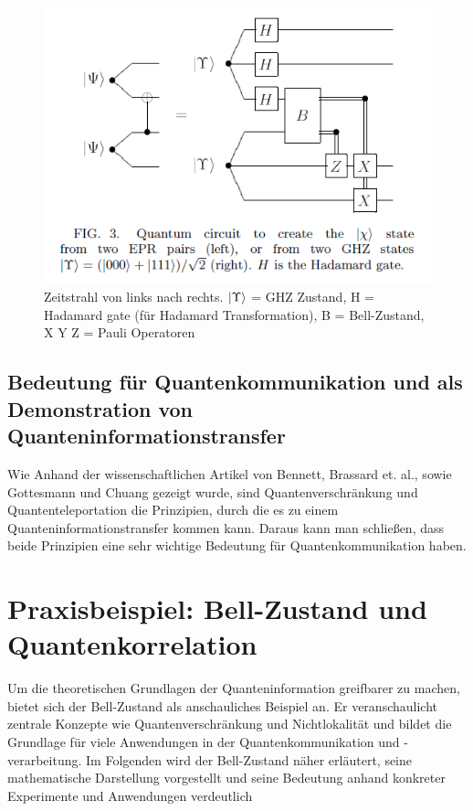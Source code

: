 \begin{figure}[h!]
    \centering
    \includegraphics[width=1.0\textwidth]{images/quantum-information/quantenteleportation_cnot_3.png}
    \caption{Zeitstrahl von links nach rechts. \(\ket{\Upsilon}\) = GHZ Zustand, H = Hadamard gate (für Hadamard Transformation), B = Bell-Zustand, X Y Z = Pauli Operatoren}
    \label{fig:meinbild}
\end{figure}
\newpage

\subsection{Bedeutung für Quantenkommunikation und als Demonstration von Quanteninformationstransfer}
Wie Anhand der wissenschaftlichen Artikel von Bennett, Brassard et. al., sowie Gottesmann und Chuang gezeigt wurde, sind Quantenverschränkung und Quantenteleportation die Prinzipien, durch die es zu einem Quanteninformationstransfer kommen kann. Daraus kann man schließen, dass beide Prinzipien eine sehr wichtige Bedeutung für Quantenkommunikation haben.

\section{Praxisbeispiel: Bell-Zustand und Quantenkorrelation}

Um die theoretischen Grundlagen der Quanteninformation greifbarer zu machen, bietet sich der Bell-Zustand als anschauliches Beispiel an. Er veranschaulicht zentrale Konzepte wie Quantenverschränkung und Nichtlokalität und bildet die Grundlage für viele Anwendungen in der Quantenkommunikation und -verarbeitung. Im Folgenden wird der Bell-Zustand näher erläutert, seine mathematische Darstellung vorgestellt und seine Bedeutung anhand konkreter Experimente und Anwendungen verdeutlich

